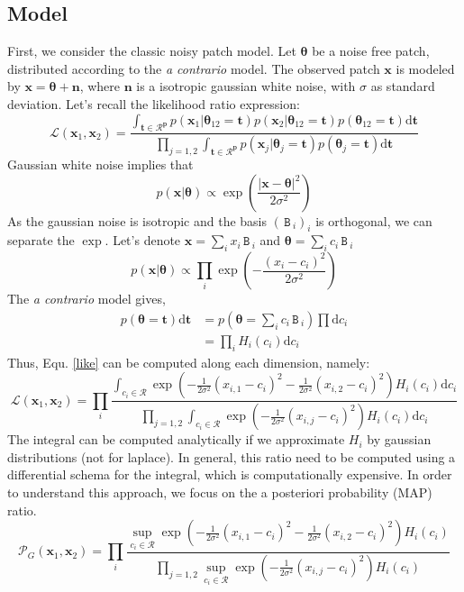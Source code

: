\documentclass[runningheads]{llncs}
\newcommand{\mat}[1]{\ensuremath{\,\mathtt{#1}\,}}
\newcommand{\thetab}{\boldsymbol\theta}
\newcommand{\xb}{\mathbf{x}}
\newcommand{\nb}{\mathbf{n}}
\newcommand{\dt}{\mathrm{d}\mathbf{t}}
\begin{document}
\subsection{Model}
First, we consider the classic noisy patch model. Let $\thetab$ be a noise free patch, distributed according to the \textit{a contrario} model. The observed patch $\xb$ is modeled by $\xb=\thetab + \nb$, where $\nb$ is a isotropic gaussian white noise, with $\sigma$ as standard deviation.  
Let's recall the likelihood ratio expression:
\begin{equation}
 \mathcal{L}(\mathbf{x}_1,\mathbf{x}_2)=
\frac{\int_{\mathbf{t \in \mathcal{R}^p}} p(\mathbf{x}_1|\boldsymbol{\theta}_{12}=\mathbf{t}) p(\mathbf{x}_2|\boldsymbol{\theta}_{12}=\mathbf{t})p(\boldsymbol{\theta}_{12}=\mathbf{t})\mathrm{d}\mathbf{t}}{\prod_{j=1,2}\int_{\mathbf{t \in \mathcal{R}^p}} p(\mathbf{x}_j|\boldsymbol{\theta}_{j}=\mathbf{t}) p(\boldsymbol{\theta}_{j}=\mathbf{t})\mathrm{d}\mathbf{t}}
\label{like}
\end{equation}
Gaussian white noise implies that 
\[
p(\xb|\thetab)\propto\exp\left(\frac{|\mathbf{x}-\boldsymbol\theta|^2}{2\sigma^2}\right)
\]
As the gaussian noise is isotropic and the basis $(\mat{B}_i)_i$ is orthogonal, we can separate the $\exp$. Let's denote $\xb=\sum_i x_i \mat{B}_i$ and $\thetab=\sum_i c_i \mat{B}_i$
\[
p(\xb|\thetab)\propto \prod_i \exp(-\frac{(x_i-c_i )^2}{2\sigma^2})
\]
The \textit{a contrario} model gives,
\[
\begin{split}
p(\thetab=\mathbf{t})\dt &=p(\thetab=\sum_i c_i \mat{B}_i) \prod \mathrm{d} c_i\\
&=\prod_i H_i(c_i) \mathrm{d} c_i
\end{split}
\]
Thus, Equ. \ref{like} can be computed along each dimension, namely:
\begin{equation}
 \mathcal{L}(\mathbf{x}_1,\mathbf{x}_2)=\prod_i \frac{\int_{c_i\in \mathcal{R}} \exp(-\frac{1}{2\sigma^2}(x_{i,1}-c_i )^2 -\frac{1}{2\sigma^2}(x_{i,2}-c_i )^2) H_i(c_i) \mathrm{d} c_i }
 {\prod_{j=1,2}\int_{c_i\in \mathcal{R}} \exp(-\frac{1}{2\sigma^2}(x_{i,j}-c_i )^2) H_i(c_i) \mathrm{d} c_i }
\end{equation}
The integral can be computed analytically if we approximate $H_i$ by gaussian distributions (not for laplace). In general, this ratio 
need to be computed using a differential schema for the integral, which is computationally expensive. In order to understand this approach, we focus on the a posteriori probability (MAP) ratio.
\begin{equation}
 \mathcal{P}_G (\mathbf{x}_1,\mathbf{x}_2)=\prod_i \frac{\sup_{c_i\in \mathcal{R}} \exp(-\frac{1}{2\sigma^2}(x_{i,1}-c_i )^2 -\frac{1}{2\sigma^2}(x_{i,2}-c_i )^2) H_i(c_i)  }
 {\prod_{j=1,2}\sup_{c_i\in \mathcal{R}} \exp(-\frac{1}{2\sigma^2}(x_{i,j}-c_i )^2) H_i(c_i)  }
\end{equation}
\end{document}
